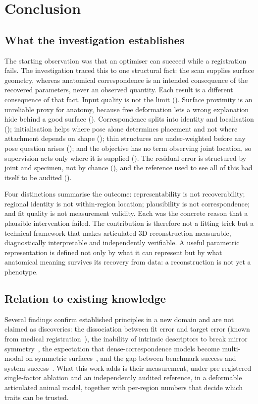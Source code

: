 \section{Conclusion}
\label{sec:conclusion}

\subsection{What the investigation establishes}

The starting observation was that an optimiser can succeed while a registration
fails. The investigation traced this to one structural fact: the scan supplies
surface geometry, whereas anatomical correspondence is an intended consequence
of the recovered parameters, never an observed quantity. Each result is a
different consequence of that fact. Input quality is not the limit ().
Surface proximity is an unreliable proxy for anatomy, because free deformation
lets a wrong explanation hide behind a good surface ().
Correspondence splits into identity and localisation (); initialisation
helps where pose alone determines placement and not where attachment depends on
shape (); thin structures are under-weighted before any pose question
arises (); and the objective has no term observing joint location, so
supervision acts only where it is supplied (). The residual error is
structured by joint and specimen, not by chance (), and the reference
used to see all of this had itself to be audited ().

Four distinctions summarise the outcome: representability is not
recoverability; regional identity is not within-region location; plausibility
is not correspondence; and fit quality is not measurement validity. Each was the
concrete reason that a plausible intervention failed. The contribution is
therefore not a fitting trick but a technical framework that makes articulated
3D reconstruction measurable, diagnostically interpretable and independently
verifiable. A useful parametric representation is defined not only by what it
can represent but by what anatomical meaning survives its recovery from data:
a reconstruction is not yet a phenotype.

\subsection{Relation to existing knowledge}

Several findings confirm established principles in a new domain and are not
claimed as discoveries: the dissociation between fit error and target error
(known from medical registration~\cite{fitzpatrick}), the inability of
intrinsic descriptors to break mirror symmetry~\cite{donati}, the expectation
that dense-correspondence models become multi-modal on symmetric
surfaces~\cite{haugaard,cse}, and the gap between benchmark success and system
success~\cite{liao}. What this work adds is their measurement, under
pre-registered single-factor ablation and an independently audited reference,
in a deformable articulated animal model, together with per-region numbers that
decide which traits can be trusted.

